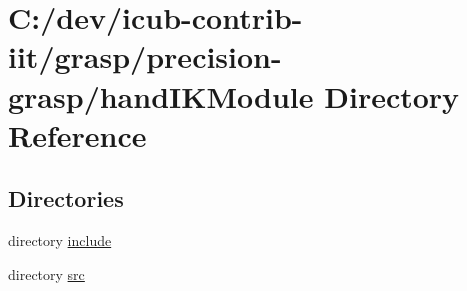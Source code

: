 \section{C\+:/dev/icub-\/contrib-\/iit/grasp/precision-\/grasp/hand\+I\+K\+Module Directory Reference}
\label{dir_b92e3a4e9c15618f0a122ef59fa44425}
\subsection*{Directories}
\begin{DoxyCompactItemize}
\item 
directory \hyperlink{dir_7c5b62cd255733f2bf7c41890e24dcad}{include}
\item 
directory \hyperlink{dir_42770607c53a71cb5927aec33c7cba76}{src}
\end{DoxyCompactItemize}
